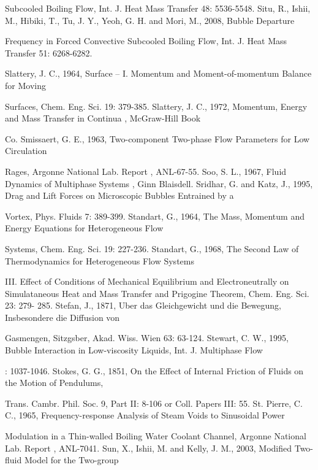 \documentclass[11pt,a4paper,openany,fontset=none]{ctexbook}
\begin{document}
{\small\raggedright\noindent Subcooled Boiling Flow, Int. J. Heat Mass Transfer 48: 5536-5548. Situ, R., Ishii, M., Hibiki, T., Tu, J. Y., Yeoh, G. H. and Mori, M., 2008, Bubble Departure\par}
{\small\raggedright\noindent Frequency in Forced Convective Subcooled Boiling Flow, Int. J. Heat Mass Transfer 51: 6268-6282.\par}
{\small\raggedright\noindent Slattery, J. C., 1964, Surface – I. Momentum and Moment-of-momentum Balance for Moving\par}
{\small\raggedright\noindent Surfaces, Chem. Eng. Sci. 19: 379-385. Slattery, J. C., 1972, Momentum, Energy and Mass Transfer in Continua , McGraw-Hill Book\par}
{\small\raggedright\noindent Co. Smissaert, G. E., 1963, Two-component Two-phase Flow Parameters for Low Circulation\par}
{\small\raggedright\noindent Rages, Argonne National Lab. Report , ANL-67-55. Soo, S. L., 1967, Fluid Dynamics of Multiphase Systems , Ginn Blaisdell. Sridhar, G. and Katz, J., 1995, Drag and Lift Forces on Microscopic Bubbles Entrained by a\par}
{\small\raggedright\noindent Vortex, Phys. Fluids 7: 389-399. Standart, G., 1964, The Mass, Momentum and Energy Equations for Heterogeneous Flow\par}
{\small\raggedright\noindent Systems, Chem. Eng. Sci. 19: 227-236. Standart, G., 1968, The Second Law of Thermodynamics for Heterogeneous Flow Systems\par}
{\small\raggedright\noindent III. Effect of Conditions of Mechanical Equilibrium and Electroneutrally on Simulataneous Heat and Mass Transfer and Prigogine Theorem, Chem. Eng. Sci. 23: 279- 285. Stefan, J., 1871, Uber das Gleichgewicht und die Bewegung, Insbesondere die Diffusion von\par}
{\small\raggedright\noindent Gasmengen, Sitzgsber, Akad. Wiss. Wien 63: 63-124. Stewart, C. W., 1995, Bubble Interaction in Low-viscosity Liquids, Int. J. Multiphase Flow\par}
{\small\raggedright{}: 1037-1046. Stokes, G. G., 1851, On the Effect of Internal Friction of Fluids on the Motion of Pendulums,\par}
{\small\raggedright\noindent Trans. Cambr. Phil. Soc. 9, Part II: 8-106 or Coll. Papers III: 55. St. Pierre, C. C., 1965, Frequency-response Analysis of Steam Voids to Sinusoidal Power\par}
{\small\raggedright\noindent Modulation in a Thin-walled Boiling Water Coolant Channel, Argonne National Lab. Report , ANL-7041. Sun, X., Ishii, M. and Kelly, J. M., 2003, Modified Two-fluid Model for the Two-group\par}
\end{document}
